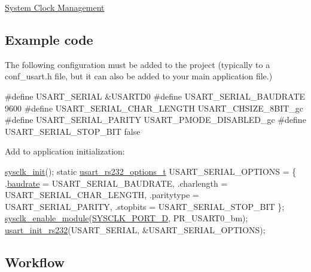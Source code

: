 \begin{DoxyEnumerate}
\item \hyperlink{group__sysclk__group}{System Clock Management} 
\end{DoxyEnumerate}\hypertarget{xmega_usart_quickstart_usart_basic_use_case_setup_code}{}\subsection{Example code}\label{xmega_usart_quickstart_usart_basic_use_case_setup_code}
The following configuration must be added to the project (typically to a conf\-\_\-usart.\-h file, but it can also be added to your main application file.) 
\begin{DoxyCode}
\textcolor{preprocessor}{        #define USART\_SERIAL                     &USARTD0}
\textcolor{preprocessor}{}\textcolor{preprocessor}{        #define USART\_SERIAL\_BAUDRATE            9600}
\textcolor{preprocessor}{}\textcolor{preprocessor}{        #define USART\_SERIAL\_CHAR\_LENGTH         USART\_CHSIZE\_8BIT\_gc}
\textcolor{preprocessor}{}\textcolor{preprocessor}{        #define USART\_SERIAL\_PARITY              USART\_PMODE\_DISABLED\_gc}
\textcolor{preprocessor}{        #define USART\_SERIAL\_STOP\_BIT            false}
\end{DoxyCode}


Add to application initialization\-: 
\begin{DoxyCode}
         \hyperlink{group__sysclk__group_ga242399e48a97739c88b4d0c00f6101de}{sysclk\_init}();
         \textcolor{keyword}{static} \hyperlink{structusart__rs232__options}{usart\_rs232\_options\_t} USART\_SERIAL\_OPTIONS
       = \{
            .\hyperlink{structusart__rs232__options_a2c48c35d680d4805d357677d7d352fd0}{baudrate} = USART\_SERIAL\_BAUDRATE,
            .charlength = USART\_SERIAL\_CHAR\_LENGTH,
            .paritytype = USART\_SERIAL\_PARITY,
            .stopbits = USART\_SERIAL\_STOP\_BIT
         \};
        \hyperlink{group__sysclk__group_gac31edbbb1296f1eb737401b7b2b4e352}{sysclk\_enable\_module}(\hyperlink{group__sysclk__group_gga8e29b46d7670875f4c509efd7a8d5f1aa953a41943eb2d157ee9edcfcd431ce46}{SYSCLK\_PORT\_D}, 
      PR\_USART0\_bm);
        \hyperlink{group__usart__group_ga507caac3c2c003461cd6ded584af984d}{usart\_init\_rs232}(USART\_SERIAL, &USART\_SERIAL\_OPTIONS);
\end{DoxyCode}
\hypertarget{xmega_usart_quickstart_usart_basic_use_case_setup_flow}{}\subsection{Workflow}\label{xmega_usart_quickstart_usart_basic_use_case_setup_flow}

